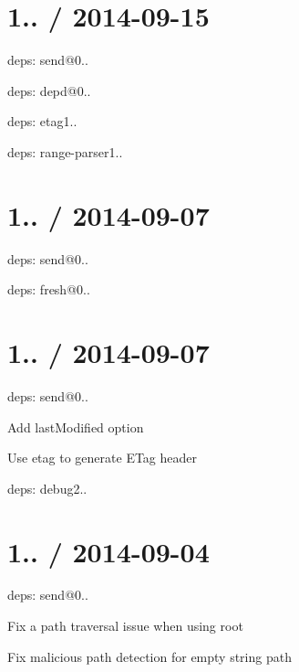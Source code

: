 \section*{1.. / 2014-\/09-\/15 }


\begin{DoxyItemize}
\item deps\+: send@0..
\begin{DoxyItemize}
\item deps\+: depd@0..
\item deps\+: etag1..
\item deps\+: range-\/parser1..
\end{DoxyItemize}
\end{DoxyItemize}

\section*{1.. / 2014-\/09-\/07 }


\begin{DoxyItemize}
\item deps\+: send@0..
\begin{DoxyItemize}
\item deps\+: fresh@0..
\end{DoxyItemize}
\end{DoxyItemize}

\section*{1.. / 2014-\/09-\/07 }


\begin{DoxyItemize}
\item deps\+: send@0..
\begin{DoxyItemize}
\item Add {\ttfamily last\+Modified} option
\item Use {\ttfamily etag} to generate {\ttfamily E\+Tag} header
\item deps\+: debug2..
\end{DoxyItemize}
\end{DoxyItemize}

\section*{1.. / 2014-\/09-\/04 }


\begin{DoxyItemize}
\item deps\+: send@0..
\begin{DoxyItemize}
\item Fix a path traversal issue when using {\ttfamily root}
\item Fix malicious path detection for empty string path
\end{DoxyItemize}
\end{DoxyItemize}

